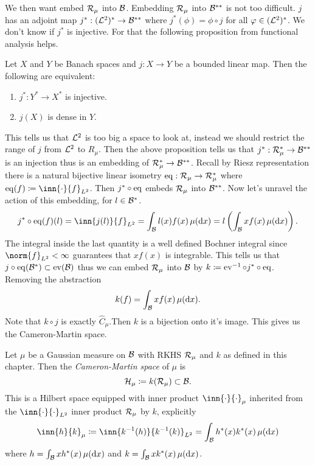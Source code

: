 We then want embed $\mathcal R_{\mu}$ into $\mathcal B$. Embedding $\mathcal R_{\mu}$ into $\mathcal B^{**}$ is not too difficult. $j$ has an adjoint map $j^*: (\mathcal L^2)^* \to \mathcal B^{**}$ where $j^*(\phi) = \phi \circ j$ for all $\varphi \in (\mathcal L^2)^*$. We don't know if $j^*$ is injective. For that the following proposition from functional analysis helps.
\begin{prop}
	Let $X$ and $Y$ be Banach spaces and $j:X \to Y$ be a bounded linear map. Then the following are equivalent:
	\begin{enumerate}
		\item $j^*: Y^* \to X^*$ is injective.
		\item $j(X)$ is dense in $Y$.
	\end{enumerate}
\end{prop}
This tells us that $\mathcal L^2$ is too big a space to look at, instead we should restrict the range of $j$ from $\mathcal L^2$ to $R_{\mu}$. Then the above proposition tells us that $j^*: \mathcal R_{\mu}^* \to \mathcal B^{**}$ is an injection thus is an embedding of $\mathcal R_{\mu}^* \to \mathcal B^{**}$. Recall by Riesz representation there is a natural bijective linear isometry $\operatorname{eq} : \mathcal R_{\mu} \to \mathcal R_{\mu}^*$ where $\eq(f) \defeq \inn{\cdot}{f}_{L^2}$. Then $j^* \circ \operatorname{eq}$ embeds $\mathcal R_{\mu}$ into $\mathcal B^{**}$. Now let's unravel the action of this embedding, for $l \in \mathcal B^*$.
\begin{align}
	j^* \circ \eq (f)(l) = \inn{j(l)}{f}_{L^2} = \int_{\calB} l(x) f(x) \mudif = l\left(\int_{\calB} x f(x) \mudif \right).
\end{align}
The integral inside the last quantity is a well defined Bochner integral since $\norm{f}_{L^2} < \infty$ guarantees that $x f(x)$ is integrable. This tells us that $j \circ \operatorname{eq}(\mathcal B^*) \subset \operatorname{ev}(\mathcal B)$ thus we can embed $\mathcal R_{\mu}$ into $\mathcal B$ by $k \coloneqq \operatorname{ev}^{-1} \circ j^* \circ \operatorname{eq}$. Removing the abstraction
\begin{equation}
	k(f) = \int_{\mathcal B} x f(x) \, \mu(\text{d} x).
\end{equation}
Note that $k \circ j$ is exactly $\hat{C}_{\mu}$.Then $k$ is a bijection onto it's image. This gives us the Cameron-Martin space.
\begin{defn}
	Let $\mu$ be a Gaussian measure on $\mathcal B$ with RKHS $\mathcal R_{\mu}$ and $k$ as defined in this chapter. Then the \emph{Cameron-Martin space} of $\mu$ is
	\begin{equation}
		\mathcal H_{\mu} \coloneqq k(\mathcal R_{\mu}) \subset \mathcal B.
	\end{equation}
	This is a Hilbert space equipped with inner product $\inn{\cdot}{\cdot}_{\mu}$ inherited from the $\inn{\cdot}{\cdot}_{L^2}$ inner product $\mathcal R_{\mu}$ by $k$, explicitly
	\begin{equation}
		\inn{h}{k}_{\mu} \defeq \inn{k^{-1}(h)}{k^{-1}(k)}_{L^2}
		= \int_{\calB} h^*(x) k^*(x) \mudif
	\end{equation}
	where $h = \int_{\mathcal B} x h^*(x) \, \mu(\text{d} x)$ and $k = \int_{\mathcal B} x k^*(x) \, \mu(\text{d} x)$.
\end{defn}
